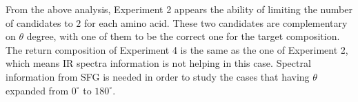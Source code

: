 
From the above analysis, Experiment 2 appears the ability of limiting the number of candidates to $2$ for each amino acid. These two candidates are complementary on $\theta$ degree, with one of them to be the correct one for the target composition. The return composition of Experiment 4 is the same as the one of Experiment 2, which means IR spectra information is not helping in this case. Spectral information from SFG is needed in order to study the cases that having $\theta$ expanded from $0^{\circ}$ to $180^{\circ}$.\\



